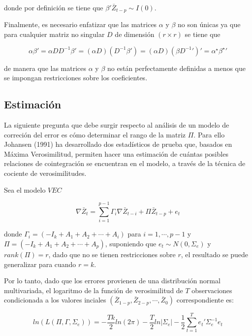  donde por definición se tiene que $\beta'\bar{Z}_{t-p}\sim I(0)$.\bigskip 
 
Finalmente, es necesario enfatizar que las matrices $\alpha$ y $\beta$ no son únicas ya que para cualquier matriz no singular $D$ de dimensión $(r \times r)$ se tiene que

\begin{equation}
\alpha\beta'=\alpha DD^{-1}\beta'= \left ( \alpha D\right )\left ( D^{-1}\beta'\right )=\left ( \alpha D\right ){\left ( \beta {D^{-1}}'\right )}'=\alpha^{\star}{\beta^{\star}}'
\end{equation}
 
de manera que las matrices $\alpha$ y $\beta$ no están perfectamente definidas a menos que se impongan restricciones sobre los coeficientes.\bigskip 


 
 
 \subsection{Estimación}
  
  La siguiente pregunta que debe surgir respecto al análisis de un modelo de correción del error es cómo determinar el rango de la matriz $\Pi$. Para ello Johansen (1991) ha desarrollado dos estadísticos de prueba que, basados en Máxima Verosimilitud, permiten hacer una estimación de cuántas posibles relaciones de cointegración se encuentran en el modelo, a través de la técnica de cociente de verosimilitudes.   \bigskip 
  
Sea el modelo $VEC$ 

   \begin{equation} 
\nabla \bar{Z}_t=\sum_{i=1}^{p-1}\Gamma_i\nabla\bar{Z}_{t-i} + \Pi\bar{Z}_{t-p}+  e_t
 \end{equation}
 

 
 donde $\Gamma_i=(-I_k +A_1+A_2+\cdots+A_i)$ para $i=1,\cdots, p-1$ y $\Pi=(-I_k + A_1 + A_2 +\cdots + A_p)$, suponiendo que $e_t \sim N(0,\Sigma_e)$ y $rank(\Pi)=r$, dado que no se tienen restricciones sobre $r$, el resultado se puede generalizar para cuando $r=k$. \bigskip 
 
 Por lo tanto, dado que los errores provienen de una distribución normal multivariada, el logaritmo de la función de verosimilitud de $T$ observaciones condicionada a los valores inciales $(\bar{Z}_{1-p}, \bar{Z}_{2-p}, \cdots, \bar{Z}_0)$ correspondiente es:
 
 \begin{equation}\label{eq:Cap5_fnverosimilitud}
 ln(L(\Pi,\Gamma, \Sigma_e))= -\frac{Tk}{2}ln(2\pi)-\frac{T}{2}ln\left | \Sigma_e \right |-\frac{1}{2}\sum_{t=1}^{T}e_t'\Sigma_e^{-1}e_t
 \end{equation}
 
